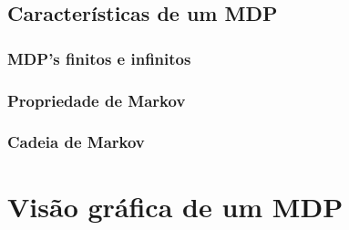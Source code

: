 \documentclass{article}
\begin{document}
            
        
        \subsection{Características de um MDP}
        
            \subsubsection{MDP's finitos e infinitos}
            
            \subsubsection{Propriedade de Markov}
            
            \subsubsection{Cadeia de Markov}
        
    \section{Visão gráfica de um MDP}
    
\end{document}
